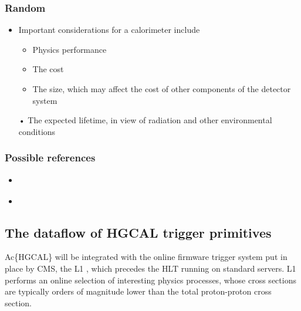 \documentclass[11pt]{article}
\begin{document}
\subsubsection{Random}
\label{sec:org832298d}
\begin{itemize}
\item Important considerations for a calorimeter include
\begin{itemize}
\item Physics performance
\item The cost
\item The size, which may affect the cost of other components of the detector system
\end{itemize}
• The expected lifetime, in view of radiation and other environmental conditions
\end{itemize}
\subsubsection{Possible references}
\label{sec:org9a06d03}
\begin{itemize}
\item \cite{cms_offline_computing}
\item \cite{hgcalTDR}
\end{itemize}
\subsection{The dataflow of HGCAL trigger primitives}
\label{sec:orgdcbf736}
\label{sec:trigger_primitives_dataflow}

Ac\{HGCAL\} will be integrated with the online firmware trigger system put in place by \ac{CMS}, the \ac{L1} \cite{l1TDR}, which precedes the \ac{HLT} running on standard servers.
\Ac{L1} performs an online selection of interesting physics processes, whose cross sections are typically orders of magnitude lower than the total proton-proton cross section.
\end{document}
